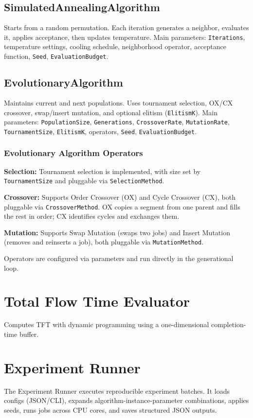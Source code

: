 \documentclass[12pt,a4paper]{report}
\begin{document}
\subsection*{SimulatedAnnealingAlgorithm}
Starts from a random permutation. Each iteration generates a neighbor, evaluates it, applies acceptance, then updates temperature. Main parameters: \texttt{Iterations}, temperature settings, cooling schedule, neighborhood operator, acceptance function, \texttt{Seed}, \texttt{EvaluationBudget}.

\subsection*{EvolutionaryAlgorithm}
Maintains current and next populations. Uses tournament selection, OX/CX crossover, swap/insert mutation, and optional elitism (\texttt{ElitismK}). Main parameters: \texttt{PopulationSize}, \texttt{Generations}, \texttt{CrossoverRate}, \texttt{MutationRate}, \texttt{TournamentSize}, \texttt{ElitismK}, operators, \texttt{Seed}, \texttt{EvaluationBudget}.

\subsubsection*{Evolutionary Algorithm Operators}
\textbf{Selection:} Tournament selection is implemented, with size set by \texttt{TournamentSize} and pluggable via \texttt{SelectionMethod}.

\textbf{Crossover:} Supports Order Crossover (OX) and Cycle Crossover (CX), both pluggable via \texttt{CrossoverMethod}. OX copies a segment from one parent and fills the rest in order; CX identifies cycles and exchanges them.

\textbf{Mutation:} Supports Swap Mutation (swaps two jobs) and Insert Mutation (removes and reinserts a job), both pluggable via \texttt{MutationMethod}.

Operators are configured via parameters and run directly in the generational loop.

\section{Total Flow Time Evaluator}
Computes TFT with dynamic programming using a one-dimensional completion-time buffer.

\section{Experiment Runner}
The Experiment Runner executes reproducible experiment batches. It loads configs (JSON/CLI), expands algorithm-instance-parameter combinations, applies seeds, runs jobs across CPU cores, and saves structured JSON outputs.
\end{document}
